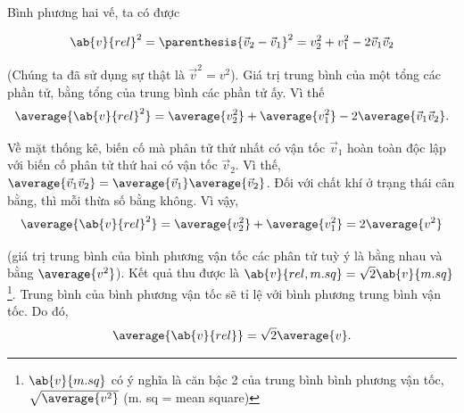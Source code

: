 \noindent
Bình phương hai vế, ta có được

\begin{equation*}
    \ab{v}{rel}^2 = \parenthesis{\vec{v}_2 - \vec{v}_1}^2 = v_2^2 + v_1^2 - 2\vec{v}_1\vec{v}_2
\end{equation*}

\noindent
(Chúng ta đã sử dụng sự thật là $\vec{v}^2=v^2$). Giá trị trung bình của một tổng các phần tử, bằng tổng của trung bình các phần tử ấy. Vì thế 
\begin{equation*}
    \average{\ab{v}{rel}^2} = \average{v_2^2} + \average{v_1^2} - 2\average{\vec{v}_1\vec{v}_2}.
\end{equation*}

\noindent
Về mặt thống kê, biến cố mà phân tử thứ nhất có vận tốc $\vec{v}_1$ hoàn toàn độc lập với biến cố phân tử thứ hai có vận tốc $\vec{v}_2$. Vì thế, $\average{\vec{v}_1\vec{v}_2}=\average{\vec{v}_1}\average{\vec{v}_2}$. Đối với chất khí ở trạng thái cân bằng, thì mỗi thừa số bằng không. Vì vậy,
\begin{equation*}
    \average{\ab{v}{rel}^2} = \average{v_2^2} + \average{v_1^2} = 2\average{v^2}
\end{equation*}

\noindent
(giá trị trung bình của bình phương vận tốc các phân tử tuỳ ý là bằng nhau và bằng $\average{v^2}$). Kết quả thu được là $\ab{v}{rel,m. sq}=\sqrt{2}\ab{v}{m. sq}$ \footnote{$\ab{v}{m. sq}$ có ý nghĩa là căn bậc 2 của trung bình bình phương vận tốc, $\sqrt{\average{v^2}}$ (m. sq = mean square) }. Trung bình của bình phương vận tốc sẽ tỉ lệ với bình phương trung bình vận tốc. Do đó,
\begin{equation*}
    \average{\ab{v}{rel}} = \sqrt{2}\average{v}.
\end{equation*}

